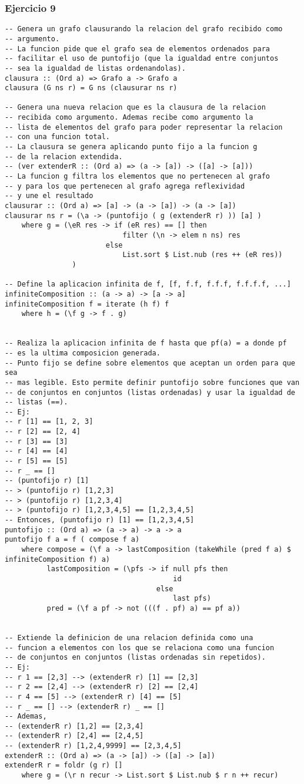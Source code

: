 \subsubsection*{Ejercicio 9}
\begin{lstlisting}
-- Genera un grafo clausurando la relacion del grafo recibido como 
-- argumento.
-- La funcion pide que el grafo sea de elementos ordenados para 
-- facilitar el uso de puntofijo (que la igualdad entre conjuntos
-- sea la igualdad de listas ordenandolas).
clausura :: (Ord a) => Grafo a -> Grafo a
clausura (G ns r) = G ns (clausurar ns r)

-- Genera una nueva relacion que es la clausura de la relacion
-- recibida como argumento. Ademas recibe como argumento la 
-- lista de elementos del grafo para poder representar la relacion
-- con una funcion total.
-- La clausura se genera aplicando punto fijo a la funcion g 
-- de la relacion extendida.
-- (ver extenderR :: (Ord a) => (a -> [a]) -> ([a] -> [a]))
-- La funcion g filtra los elementos que no pertenecen al grafo
-- y para los que pertenecen al grafo agrega reflexividad
-- y une el resultado
clausurar :: (Ord a) => [a] -> (a -> [a]) -> (a -> [a])
clausurar ns r = (\a -> (puntofijo ( g (extenderR r) )) [a] )
	where g = (\eR res -> if (eR res) == [] then 
							filter (\n -> elem n ns) res
						else 
							List.sort $ List.nub (res ++ (eR res))
				)

-- Define la aplicacion infinita de f, [f, f.f, f.f.f, f.f.f.f, ...]
infiniteComposition :: (a -> a) -> [a -> a]
infiniteComposition f = iterate (h f) f
	where h = (\f g -> f . g)
		
		
-- Realiza la aplicacion infinita de f hasta que pf(a) = a donde pf 
-- es la ultima composicion generada. 
-- Punto fijo se define sobre elementos que aceptan un orden para que sea
-- mas legible. Esto permite definir puntofijo sobre funciones que van
-- de conjuntos en conjuntos (listas ordenadas) y usar la igualdad de
-- listas (==).
-- Ej:
-- r [1] == [1, 2, 3]
-- r [2] == [2, 4]
-- r [3] == [3]
-- r [4] == [4]
-- r [5] == [5]
-- r _ == []
-- (puntofijo r) [1] 
-- > (puntofijo r) [1,2,3] 
-- > (puntofijo r) [1,2,3,4] 
-- > (puntofijo r) [1,2,3,4,5] == [1,2,3,4,5]
-- Entonces, (puntofijo r) [1] == [1,2,3,4,5]
puntofijo :: (Ord a) => (a -> a) -> a -> a	
puntofijo f a = f ( compose f a)
    where compose = (\f a -> lastComposition (takeWhile (pred f a) $ infiniteComposition f) a)
          lastComposition = (\pfs -> if null pfs then 
										id 
									else 
										last pfs)
          pred = (\f a pf -> not (((f . pf) a) == pf a))	
		  
	
-- Extiende la definicion de una relacion definida como una
-- funcion a elementos con los que se relaciona como una funcion
-- de conjuntos en conjuntos (listas ordenadas sin repetidos).
-- Ej:
-- r 1 == [2,3] --> (extenderR r) [1] == [2,3]  
-- r 2 == [2,4] --> (extenderR r) [2] == [2,4] 
-- r 4 == [5] --> (extenderR r) [4] == [5] 
-- r _ == [] --> (extenderR r) _ == [] 
-- Ademas,
-- (extenderR r) [1,2] == [2,3,4]
-- (extenderR r) [2,4] == [2,4,5]
-- (extenderR r) [1,2,4,9999] == [2,3,4,5]   
extenderR :: (Ord a) => (a -> [a]) -> ([a] -> [a])
extenderR r = foldr (g r) []
	where g = (\r n recur -> List.sort $ List.nub $ r n ++ recur)
\end{lstlisting}
